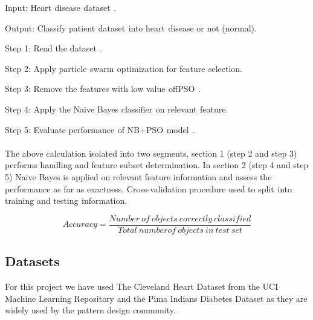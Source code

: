 \documentclass[oneside,12pt]{Classes/VTU}
\begin{document}
    Input: Heart\tiny\textcolor{white}{s}\normalsize disease\tiny\textcolor{white}{s}\normalsize dataset\tiny\textcolor{white}{s}\normalsize.
    
    Output: Classify patient\tiny\textcolor{white}{s}\normalsize dataset\tiny\textcolor{white}{s}\normalsize into heart\tiny\textcolor{white}{s}\normalsize disease or not (normal).
    
    Step 1: Read the dataset\tiny\textcolor{white}{s}\normalsize.
    
    Step 2: Apply particle\tiny\textcolor{white}{s}\normalsize swarm\tiny\textcolor{white}{s}\normalsize optimization for feature\tiny\textcolor{white}{s}\normalsize selection. 
    
    Step 3: Remove the features with low value\tiny\textcolor{white}{s}\normalsize of\tiny\textcolor{white}{f}\normalsize PSO\tiny\textcolor{white}{s}\normalsize.
    
    Step 4: Apply the Naive Bayes classifier\tiny\textcolor{white}{s}\normalsize on relevant\tiny\textcolor{white}{s}\normalsize feature. 
    
    Step 5: Evaluate performance\tiny\textcolor{white}{s}\normalsize of NB+PSO\tiny\textcolor{white}{s}\normalsize model\tiny\textcolor{white}{s}\normalsize.
    
    \paragraph{}
    The above calculation isolated into two segments, section 1 (step 2 and step 3) performs handling and feature subset determination. In section 2 (step 4 and step 5) Naive Bayes is applied on relevant feature information and assess the performance as far as exactness. Cross-validation procedure used to split\tiny\textcolor{white}{s}\normalsize into training and testing\tiny\textcolor{white}{s}\normalsize information.     
    \begin{center}
    	\[Accuracy = \frac{Number \ of \ objects \ correctly \ classified}{Total \ number of \ objects \ in  \ test \ set}\]     
    \end{center}
    
    
    \subsection{Datasets}
    For this project we have used The Cleveland Heart Dataset from the UCI Machine Learning Repository and the Pima Indians Diabetes Dataset as they are widely used by the pattern design community.\\
    \linebreak
\end{document}

